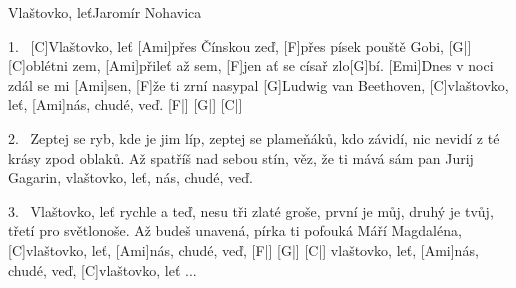 \begin{song}{Vlaštovko, leť}{Jaromír Nohavica}

\begin{xverse}{1.~}
[\large C]Vlaštovko, leť [\large Ami]přes Čínskou zeď,
[\large F]přes písek pouště Gobi, [\large G|]{}
[\large C]oblétni zem, [\large Ami]přileť až sem,
[\large F]jen ať se císař zlo[\large G]bí.
[\large Emi]Dnes v noci zdál se mi [\large Ami]sen,
[\large F]{že} ti zrní nasypal [\large G]Ludwig van Beethoven,
[\large C]vlaštovko, leť, [\large Ami]nás, chudé, veď. [\large F|]{} [\large G|]{} [\large C|]{}
\end{xverse}

\begin{xverse}{2.~}
Zeptej se ryb, kde je jim líp,
zeptej se plameňáků,
kdo závidí, nic nevidí
z té krásy zpod oblaků.
Až spatříš nad sebou stín,
věz, že ti mává sám pan Jurij Gagarin,
vlaštovko, leť, nás, chudé, veď.
\end{xverse}

\begin{xverse}{3.~}
Vlaštovko, leť rychle a teď,
nesu tři zlaté groše,
první je můj, druhý je tvůj,
třetí pro světlonoše.
Až budeš unavená,
pírka ti pofouká Máří Magdaléna,
[\large C]vlaštovko, leť, [\large Ami]nás, chudé, veď, [\large F|]{} [\large G|]{} [\large C|]{}
vlaštovko, leť, [\large Ami]nás, chudé, veď,
[\large C]vlaštovko, leť ...
\end{xverse}

\end{song}







